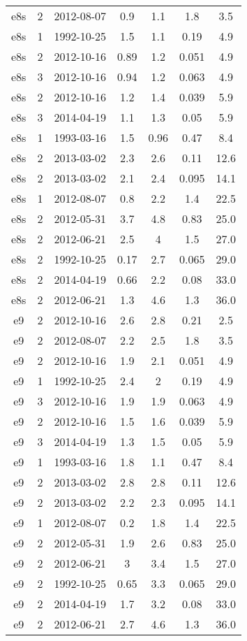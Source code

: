 \begin{table*}[htp]
\begin{tabular}{ccccccc}
e8s & 2 & 2012-08-07 & 0.9 & 1.1 & 1.8 & 3.5 \\
e8s & 1 & 1992-10-25 & 1.5 & 1.1 & 0.19 & 4.9 \\
e8s & 2 & 2012-10-16 & 0.89 & 1.2 & 0.051 & 4.9 \\
e8s & 3 & 2012-10-16 & 0.94 & 1.2 & 0.063 & 4.9 \\
e8s & 2 & 2012-10-16 & 1.2 & 1.4 & 0.039 & 5.9 \\
e8s & 3 & 2014-04-19 & 1.1 & 1.3 & 0.05 & 5.9 \\
e8s & 1 & 1993-03-16 & 1.5 & 0.96 & 0.47 & 8.4 \\
e8s & 2 & 2013-03-02 & 2.3 & 2.6 & 0.11 & 12.6 \\
e8s & 2 & 2013-03-02 & 2.1 & 2.4 & 0.095 & 14.1 \\
e8s & 1 & 2012-08-07 & 0.8 & 2.2 & 1.4 & 22.5 \\
e8s & 2 & 2012-05-31 & 3.7 & 4.8 & 0.83 & 25.0 \\
e8s & 2 & 2012-06-21 & 2.5 & 4 & 1.5 & 27.0 \\
e8s & 2 & 1992-10-25 & 0.17 & 2.7 & 0.065 & 29.0 \\
e8s & 2 & 2014-04-19 & 0.66 & 2.2 & 0.08 & 33.0 \\
e8s & 2 & 2012-06-21 & 1.3 & 4.6 & 1.3 & 36.0 \\
e9 & 2 & 2012-10-16 & 2.6 & 2.8 & 0.21 & 2.5 \\
e9 & 2 & 2012-08-07 & 2.2 & 2.5 & 1.8 & 3.5 \\
e9 & 2 & 2012-10-16 & 1.9 & 2.1 & 0.051 & 4.9 \\
e9 & 1 & 1992-10-25 & 2.4 & 2 & 0.19 & 4.9 \\
e9 & 3 & 2012-10-16 & 1.9 & 1.9 & 0.063 & 4.9 \\
e9 & 2 & 2012-10-16 & 1.5 & 1.6 & 0.039 & 5.9 \\
e9 & 3 & 2014-04-19 & 1.3 & 1.5 & 0.05 & 5.9 \\
e9 & 1 & 1993-03-16 & 1.8 & 1.1 & 0.47 & 8.4 \\
e9 & 2 & 2013-03-02 & 2.8 & 2.8 & 0.11 & 12.6 \\
e9 & 2 & 2013-03-02 & 2.2 & 2.3 & 0.095 & 14.1 \\
e9 & 1 & 2012-08-07 & 0.2 & 1.8 & 1.4 & 22.5 \\
e9 & 2 & 2012-05-31 & 1.9 & 2.6 & 0.83 & 25.0 \\
e9 & 2 & 2012-06-21 & 3 & 3.4 & 1.5 & 27.0 \\
e9 & 2 & 1992-10-25 & 0.65 & 3.3 & 0.065 & 29.0 \\
e9 & 2 & 2014-04-19 & 1.7 & 3.2 & 0.08 & 33.0 \\
e9 & 2 & 2012-06-21 & 2.7 & 4.6 & 1.3 & 36.0 \\
\hline
\end{tabular}

\end{table*}
